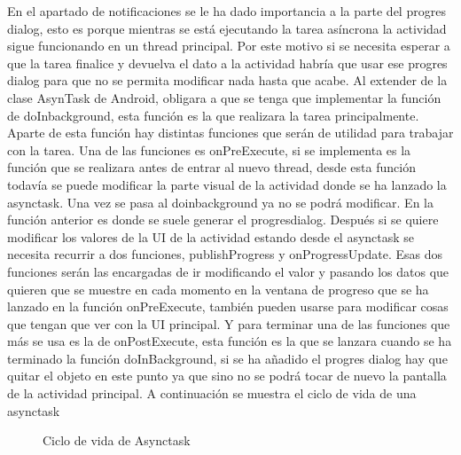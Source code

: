 En el apartado de notificaciones se le ha dado importancia a la parte del progres dialog, esto es porque mientras se está ejecutando la tarea asíncrona la actividad sigue funcionando en un thread principal. Por este motivo si se necesita esperar a que la tarea finalice y devuelva el dato a la actividad habría que usar ese progres dialog para que no se permita modificar nada hasta que acabe.
Al extender de la clase AsynTask de Android, obligara a que se tenga que implementar la función de doInbackground, esta función es la que realizara la tarea principalmente.
Aparte de esta función hay distintas funciones que serán de utilidad para trabajar con la tarea.
Una de las funciones es onPreExecute, si se implementa es la función que se realizara antes de entrar al nuevo thread, desde esta función todavía se puede modificar la parte visual de la actividad donde se ha lanzado la asynctask. Una vez se pasa al doinbackground ya no se podrá modificar.
En la función anterior es donde se suele generar el progresdialog.
Después si se quiere modificar los valores de la UI de la actividad estando desde el asynctask se necesita recurrir a dos funciones, publishProgress y onProgressUpdate.
Esas dos funciones serán las encargadas de ir modificando el valor y pasando los datos que quieren que se muestre en cada momento en la ventana de progreso que se ha lanzado en la función onPreExecute, también pueden usarse para modificar cosas que tengan que ver con la UI principal.
Y para terminar una de las funciones que más se usa es la de onPostExecute, esta función es la que se lanzara cuando se ha terminado  la función doInBackground, si se ha añadido el progres dialog hay que quitar el objeto en este punto ya que sino no se podrá tocar de nuevo la pantalla de la actividad principal.
A continuación se muestra el ciclo de vida de una asynctask

\begin{figure}[H] 
  \begin{center} 
    \caption{Ciclo de vida de Asynctask} 
    \label{fig:CicloVidaAsynctask} 
  \end{center} 
\end{figure}


